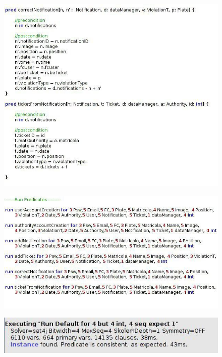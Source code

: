 \documentclass {article}
\begin{document}
		\begin{figure}[H]
			\centering
			\includegraphics[scale=0.75]{Images/Alloy/alloy_5.jpg}
		\end{figure}
		\begin{figure}[H]
			\centering
			\includegraphics[scale=0.75]{Images/Alloy/alloy_6.jpg}
		\end{figure}
		\begin{figure}[H]
			\centering
			\includegraphics[scale=0.85]{Images/Alloy/executing_0.jpg}
		\end{figure}
\end{document}
